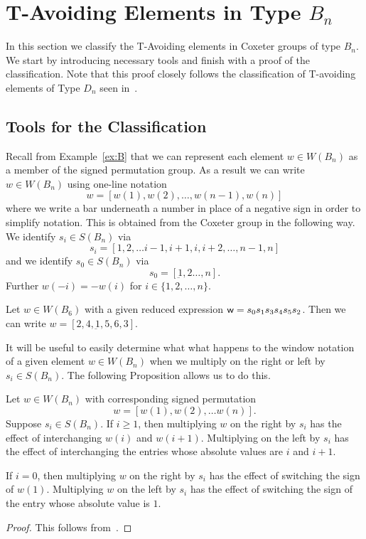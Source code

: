 \chapter{T-Avoiding Elements in Type $B_n$}

In this section we classify the T-Avoiding elements in Coxeter groups of type $B_n$. We start by introducing necessary tools and finish with a proof of the classification. Note that this proof closely follows the classification of T-avoiding elements of Type $D_n$ seen in~\cite{Gern2013a}.

\section{Tools for the Classification}

Recall from Example~\ref{ex:B} that we can represent each element $w \in W(B_n)$ as a member of the signed permutation group. As a result we can write $w \in W(B_n)$ using one-line notation 
\[ w=[w(1),w(2), \ldots, w(n-1), w(n)] \]
where we write a bar underneath a number in place of a negative sign in order to simplify notation. This is obtained from the Coxeter group in the following way. We identify $s_i \in S(B_n)$ via 
\[s_i=[1,2, \ldots i-1, i+1,i,i+2, \ldots, n-1,n] \] and we identify $s_0 \in S(B_n)$ via
\[s_0=[\underbar{1}, 2 \ldots, n].\] Further $w(-i)=-w(i)$ for $i \in \{1,2, \ldots, n\}$.

\begin{example}
Let $w \in W(B_6)$ with a given reduced expression $\mathsf{w}=s_0s_1s_3s_4s_5s_2$. Then we can write $w=[2, 4, \underbar{1}, 5, 6, 3]$. 
\end{example}

It will be useful to easily determine what what happens to the window notation of a given element $w \in W(B_n)$ when we multiply on the right or left by $s_i \in S(B_n)$. The following Proposition allows us to do this.

\begin{proposition}
	Let $w \in W(B_n)$ with corresponding signed permutation 
	\[w=[w(1),w(2), \ldots w(n)].\]
	Suppose $s_i \in S(B_n)$. If $i \geq 1$, then multiplying $w$ on the right by $s_i$ has the effect of interchanging $w(i)$ and $w(i+1)$. Multiplying on the left by $s_i$ has the effect of interchanging the entries whose absolute values are $i$ and $i+1$.
	
	If $i=0$, then multiplying $w$ on the right by $s_i$ has the effect of switching the sign of $w(1)$. Multiplying $w$ on the left by $s_i$ has the effect of switching the sign of the entry whose absolute value is $1$.
	\begin{proof}
	This follows from~\cite[Section 8.1 and A3.1]{Bjorner2005}.	
	\end{proof}
\end{proposition}

